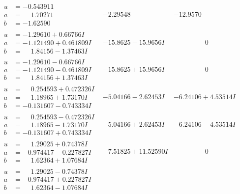 \documentclass[1p]{elsarticle_modified}
\theoremstyle{definition}
\begin{document}
$$\begin{array}{c|c|c}
\begin{aligned}
u &= -0.543911\phantom{ +0.000000I} \\
a &= \phantom{-}1.70271\phantom{ +0.000000I} \\
b &= -1.62590\phantom{ +0.000000I}\end{aligned}
 & -2.29548\phantom{ +0.000000I} & -12.9570\phantom{ +0.000000I} \\ \hline\begin{aligned}
u &= -1.29610 + 0.66766 I \\
a &= -1.121490 + 0.461809 I \\
b &= \phantom{-}1.84156 - 1.37463 I\end{aligned}
 & -15.8625 - 15.9656 I & \phantom{-0.000000 } 0 \\ \hline\begin{aligned}
u &= -1.29610 - 0.66766 I \\
a &= -1.121490 - 0.461809 I \\
b &= \phantom{-}1.84156 + 1.37463 I\end{aligned}
 & -15.8625 + 15.9656 I & \phantom{-0.000000 } 0 \\ \hline\begin{aligned}
u &= \phantom{-}0.254593 + 0.472326 I \\
a &= \phantom{-}1.18965 + 1.73170 I \\
b &= -0.131607 - 0.743334 I\end{aligned}
 & -5.04166 - 2.62453 I & -6.24106 + 4.53514 I \\ \hline\begin{aligned}
u &= \phantom{-}0.254593 - 0.472326 I \\
a &= \phantom{-}1.18965 - 1.73170 I \\
b &= -0.131607 + 0.743334 I\end{aligned}
 & -5.04166 + 2.62453 I & -6.24106 - 4.53514 I \\ \hline\begin{aligned}
u &= \phantom{-}1.29025 + 0.74378 I \\
a &= -0.974417 - 0.227827 I \\
b &= \phantom{-}1.62364 + 1.07684 I\end{aligned}
 & -7.51825 + 11.52590 I & \phantom{-0.000000 } 0 \\ \hline\begin{aligned}
u &= \phantom{-}1.29025 - 0.74378 I \\
a &= -0.974417 + 0.227827 I \\
b &= \phantom{-}1.62364 - 1.07684 I\end{aligned}

\end{array}$$
\end{document}
